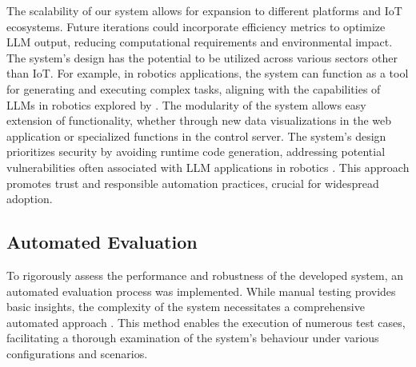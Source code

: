 \documentclass{ieeeaccess}
\begin{document}
The scalability of our system allows for expansion to different platforms and IoT ecosystems. Future iterations could incorporate efficiency metrics to optimize LLM output, reducing computational requirements and environmental impact. The system's design has the potential to be utilized across various sectors other than IoT. For example, in robotics applications, the system can function as a tool for generating and executing complex tasks, aligning with the capabilities of LLMs in robotics explored by \citet{10500490}. The modularity of the system allows easy extension of functionality, whether through new data visualizations in the web application or specialized functions in the control server. The system's design prioritizes security by avoiding runtime code generation, addressing potential vulnerabilities often associated with LLM applications in robotics \cite{10500490}. This approach promotes trust and responsible automation practices, crucial for widespread adoption.






\subsection{Automated Evaluation}
To rigorously assess the performance and robustness of the developed system, an automated evaluation process was implemented. While manual testing provides basic insights, the complexity of the system necessitates a comprehensive automated approach \cite{1290484}. This method enables the execution of numerous test cases, facilitating a thorough examination of the system's behaviour under various configurations and scenarios.
\end{document}
